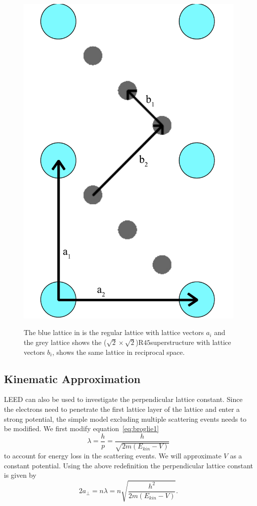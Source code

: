 \documentclass[a4paper,10pt]{scrartcl}
\begin{document}
\begin{figure}
{\includegraphics[scale=0.35]{img/superstructure2}
\label{fig:sup2}
}
\caption{The blue lattice in  is the regular lattice with lattice vectors $a_i$ and the grey lattice shows the ($\sqrt{2} \times \sqrt{2}$)R$45$\textdegree superstructure with lattice vectors $b_i$,  shows the same lattice in reciprocal space.}
\end{figure}

\subsection{Kinematic Approximation}

LEED can also be used to investigate the perpendicular lattice constant. Since the electrons need to penetrate the first lattice layer of the lattice and enter a strong potential, the simple model excluding multiple scattering events needs to be modified. We first modify equation~\eqref{eq:broglie1}
\begin{equation}
\lambda = \frac{h}{p} = \frac{h}{\sqrt{2m(E_{kin}-V)}}
\end{equation}
to account for energy loss in the scattering events. We will approximate $V$ as a constant potential. Using the above redefinition the perpendicular lattice constant is given by
\begin{equation}
2a_{\perp} = n\lambda = n \sqrt{\frac{h^{2}}{2m(E_{kin}-V)}}.
\end{equation}
\end{document}
